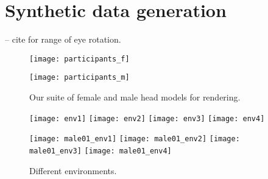 
\section{Synthetic data generation}

\cite{MIL-STD-1472G} -- cite for range of eye rotation.

\begin{figure}
    \texttt{[image: participants\_f]} \par \smallskip
    \texttt{[image: participants\_m]}
    \caption{Our suite of female and male head models for rendering.}
    \label{fig:participants}
\end{figure}

\begin{figure}
    \texttt{[image: env1]} \hfill
    \texttt{[image: env2]} \hfill
    \texttt{[image: env3]} \hfill
    \texttt{[image: env4]} \par \vspace{-0.01em}
    \texttt{[image: male01\_env1]} \hfill
    \texttt{[image: male01\_env2]} \hfill
    \texttt{[image: male01\_env3]} \hfill
    \texttt{[image: male01\_env4]}
    \caption{Different environments.}
    \label{fig:participants}
\end{figure}